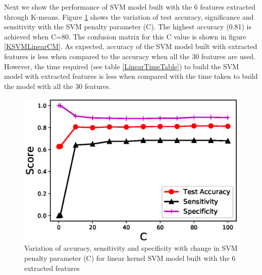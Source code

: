 \documentclass[twoside]{iitbreport}
\begin{document}
Next we show the performance of SVM model built with the 6 features extracted through K-means. Figure \ref{KSVMLinear} shows the variation of test accuracy, significance and sensitivity with the SVM penalty parameter (C). The highest accuracy (0.81) is achieved when C=80. The confusion matrix for this C value is shown in figure \ref{KSVMLinearCM}. As expected, accuracy of the SVM model built with extracted features is less when compared to the accuracy when all the 30 features are used. However, the time required (see table \ref{LinearTimeTable}) to build the SVM model with extracted features is less when compared with the time taken to build the model with all the 30 features.   
\begin{figure}[H]
  \begin{center}
    \includegraphics[trim={0cm 0cm 0cm 0cm},clip,scale=1]{Figures/KSVM_Linear_Accuracy}
  \end{center}
  \caption{Variation of accuracy, sensitivity and specificity with change in SVM penalty parameter (C) for linear kernel SVM model built with the 6 extracted features}
  \label{KSVMLinear}
\end{figure}
\end{document}
